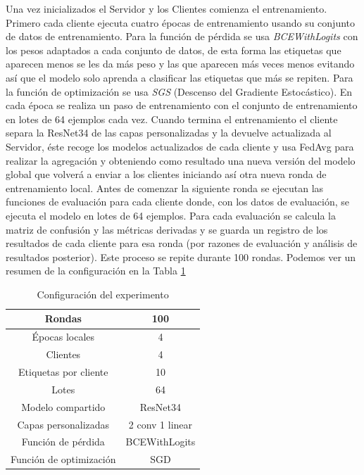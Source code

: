 Una vez inicializados el Servidor y los Clientes comienza el entrenamiento. Primero cada cliente ejecuta cuatro épocas de entrenamiento usando su conjunto de datos de entrenamiento. Para la función de pérdida se usa \textit{BCEWithLogits} con los pesos adaptados a cada conjunto de datos, de esta forma las etiquetas que aparecen menos se les da más peso y las que aparecen más veces menos evitando así que el modelo solo aprenda a clasificar las etiquetas que más se repiten. Para la función de optimización se usa \textit{SGS} (Descenso del Gradiente Estocástico). En cada época se realiza un paso de entrenamiento con el conjunto de entrenamiento en lotes de 64 ejemplos cada vez. Cuando termina el entrenamiento el cliente separa la ResNet34 de las capas personalizadas y la devuelve actualizada al Servidor, éste recoge los modelos actualizados de cada cliente y usa FedAvg para realizar la agregación y obteniendo como resultado una nueva versión del modelo global que volverá a enviar a los clientes iniciando así otra nueva ronda de entrenamiento local. Antes de comenzar la siguiente ronda se ejecutan las funciones de evaluación para cada cliente donde, con los datos de evaluación, se ejecuta el modelo en lotes de 64 ejemplos. Para cada evaluación se calcula la matriz de confusión y las métricas derivadas y se guarda un registro de los resultados de cada cliente para esa ronda (por razones de evaluación y análisis de resultados posterior). Este proceso se repite durante 100 rondas. Podemos ver un resumen de la configuración en la Tabla \ref{table:configuration}

\begin{table}[!h]
	\centering
	
	\begin{tabular}{ |c| c| }
		\hline
		Rondas & 100 \\ \hline
		Épocas locales & 4 \\ \hline
		Clientes & 4 \\  \hline
		Etiquetas por cliente & 10 \\ \hline
		Lotes & 64 \\ \hline
		Modelo compartido & ResNet34 \\ \hline
		Capas personalizadas & 2 conv 1 linear \\ \hline
		Función de pérdida & BCEWithLogits \\ \hline
		Función de optimización & SGD \\
		\hline 
	\end{tabular}
	\caption{Configuración del experimento}
	\label{table:configuration}
\end{table}

